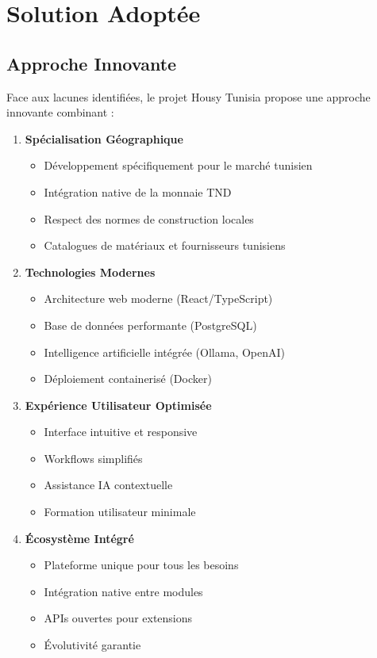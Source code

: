 \section{Solution Adoptée}

\subsection{Approche Innovante}

Face aux lacunes identifiées, le projet Housy Tunisia propose une approche innovante combinant :

\begin{enumerate}
    \item \textbf{Spécialisation Géographique}
    \begin{itemize}
        \item Développement spécifiquement pour le marché tunisien
        \item Intégration native de la monnaie TND
        \item Respect des normes de construction locales
        \item Catalogues de matériaux et fournisseurs tunisiens
    \end{itemize}
    
    \item \textbf{Technologies Modernes}
    \begin{itemize}
        \item Architecture web moderne (React/TypeScript)
        \item Base de données performante (PostgreSQL)
        \item Intelligence artificielle intégrée (Ollama, OpenAI)
        \item Déploiement containerisé (Docker)
    \end{itemize}
    
    \item \textbf{Expérience Utilisateur Optimisée}
    \begin{itemize}
        \item Interface intuitive et responsive
        \item Workflows simplifiés
        \item Assistance IA contextuelle
        \item Formation utilisateur minimale
    \end{itemize}
    
    \item \textbf{Écosystème Intégré}
    \begin{itemize}
        \item Plateforme unique pour tous les besoins
        \item Intégration native entre modules
        \item APIs ouvertes pour extensions
        \item Évolutivité garantie
    \end{itemize}
\end{enumerate}

